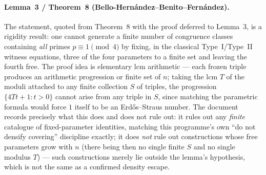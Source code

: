 \documentclass[11pt]{article}
\theoremstyle{plain}
\theoremstyle{definition}
\theoremstyle{remark}
\renewcommand{\_}{\textunderscore\allowbreak}
\begin{document}
\paragraph{Lemma~3 / Theorem~8 (Bello-Hern\'andez--Benito--Fern\'andez).} The statement, quoted
from \cite{BelloHernandez2026} Theorem~8 with the proof deferred to \cite{BelloHernandez2010}
Lemma~3, is a rigidity
result: one cannot generate a finite number of congruence classes containing \emph{all} primes
$p\equiv1\pmod4$ by fixing, in the classical Type~I/Type~II witness equations, three of the four
parameters to a finite set and leaving the fourth free. The proof idea is elementary lcm
arithmetic — each frozen triple produces an arithmetic progression or finite set of $n$; taking
the lcm $T$ of the moduli attached to any finite collection $S$ of triples, the progression
$\{4Tt+1:t>0\}$ cannot arise from any triple in $S$, since matching the parametric formula would
force $1$ itself to be an Erd\H{o}s--Straus number. The document records precisely what this does
and does not rule out: it rules out any \emph{finite} catalogue of fixed-parameter identities,
matching this programme's own ``do not densify covering'' discipline exactly; it does
\emph{not} rule out constructions whose free parameters grow with $n$ (there being then no
single finite $S$ and no single modulus $T$) — such constructions merely lie outside the
lemma's hypothesis, which is not the same as a confirmed density escape.
\end{document}
